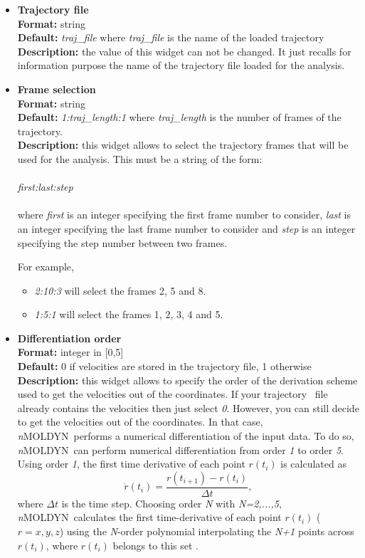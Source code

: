 \documentclass[a4paper,11pt]{report}
\newcommand{\NMOLDYN}{\textit{n}MOLDYN}
\begin{document}
\begin{itemize}
\item \textbf{Trajectory file}\\
\textbf{Format:} string\\
\textbf{Default:} \textit{traj\_file} where \textit{traj\_file} is the name of the loaded trajectory\\
\textbf{Description:} the value of this widget can not be changed. It just recalls for information purpose the name
of the trajectory file loaded for the analysis.

\item \textbf{Frame selection}\\
\textbf{Format:} string\\
\textbf{Default:} \textit{1:traj\_length:1} where \textit{traj\_length} is the number of frames of the trajectory.\\
\textbf{Description:} this widget allows to select the trajectory frames that will be used for the analysis. This must
be a string of the form:
\\\\
\textit{first:last:step}
\\\\
where \textit{first} is an integer specifying the first frame number to consider, \textit{last} is an integer specifying the last 
frame number to consider and \textit{step} is an integer specifying the step number between two frames.

For example,
\begin{itemize}
\item \textit{2:10:3} will select the frames 2, 5 and 8.
\item \textit{1:5:1} will select the frames 1, 2, 3, 4 and 5.
\end{itemize}

\item \textbf{Differentiation order}\\
\textbf{Format:} integer in [0,5]\\
\textbf{Default:} 0 if velocities are stored in the trajectory file, 1 otherwise\\
\textbf{Description:} this widget allows to specify the order of the derivation scheme used to get the velocities out 
of the coordinates. If your trajectory \NetCDF\ file already contains the velocities then just select \textit{0}.
However, you can still decide to get the velocities out of the coordinates. In that case, \NMOLDYN\ performs a numerical 
differentiation of the input data. To do so, \NMOLDYN\ can perform numerical differentiation from order \textit{1} to 
order \textit{5}. Using order \textit{1}, the first time derivative of each point $r(t_i)$ 
is calculated as
\begin{equation}
\dot{r}(t_i)=\frac{r(t_{i+1})-r(t_{i})} {\Delta t},
\end{equation}
where $\Delta t$ is the time step. 
Choosing order \textit{N} with \textit{N=2,...,5}, \NMOLDYN\ calculates the first time-derivative of each point 
$r(t_i)$ ($r=x,y,z$) using the \textit{N}-order polynomial interpolating the \textit{N+1} points across $r(t_i)$, where $r(t_i)$ 
belongs to this set \cite{Abramowitz}.


\end{itemize}
\end{document}
